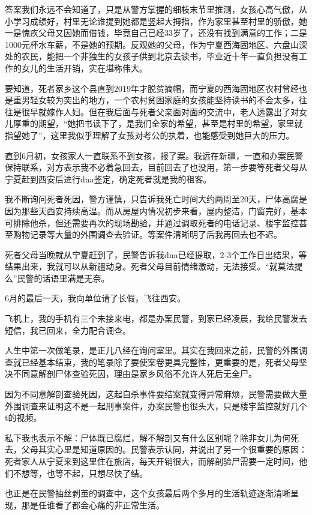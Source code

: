 答案我们永远不会知道了，只是从警方掌握的细枝末节里推测，女孩心高气傲，从小学习成绩好，村里无论谁提到她都是竖起大拇指，作为家里甚至村里的骄傲，她一是愧疚父母又因她而借钱，毕竟自己已经33岁了，还没有找到满意的工作；二是1000元杯水车薪，不是她的预期。反观她的父母，作为宁夏西海固地区、六盘山深处的农民，能把一个非独生的女孩子供到北京去读书，毕业近十年一直负担没有工作的女儿的生活开销，实在堪称伟大。

要知道，死者家乡这个县直到2019年才脱贫摘帽，而宁夏的西海固地区农村曾经也是重男轻女较为突出的地方，一个农村贫困家庭的女孩能坚持读书的不会太多，往往是很早就嫁作人妇。但在我后面与死者父亲面对面的交流中，老人透露出了对女儿厚重的期望，“她把书读下了，是我们全家的希望，甚至是村里的希望，家里就指望她了”，这里我似乎理解了女孩对考公的执着，也能感受到她巨大的压力。

直到6月初，女孩家人一直联系不到女孩，报了案。我远在新疆，一直和办案民警保持联系，对方表示我不必着急回去，目前回去了也没用，第一步要等死者父母从宁夏赶到西安后进行dna鉴定，确定死者就是我的租客。

我不断询问死者死因，警方谨慎，只告诉我死亡时间大约两周至20天，尸体高腐是因为那些天西安持续高温。而从房屋内情况初步来看，屋内整洁，门窗完好，基本可排除他杀，但还需要再次的现场勘验，并通过调取死者的电话记录、楼宇监控甚至购物记录等大量的外围调查去验证。等案件清晰明了后我再回去也不迟。

死者父母当晚就从宁夏赶到了，民警告诉我dna已经提取，2-3个工作日出结果，等结果出来，我就可以从新疆动身。死者父母目前情绪激动，无法接受。“就莫法提么”民警的话语里满是无奈。

6月的最后一天，我向单位请了长假，飞往西安。

飞机上，我的手机有三个未接来电，都是办案民警，到家已经凌晨，我给民警发去短信，我已回来，全力配合调查。

人生中第一次做笔录，是正儿八经在询问室里。其实在我回来之前，民警的外围调查就已经基本结束，我的笔录除了要使案卷更具完整性，更重要的是，死者父母坚决不同意解剖尸体查验死因，理由是家乡风俗不允许人死后无全尸。

因为不同意解剖查验死因，这起自杀事件要结案就变得异常麻烦，民警需要做大量外围调查来证明这不是一起刑事案件，办案民警也很头大，只是楼宇监控就好几个t的视频。

私下我也表示不解：尸体既已腐烂，解不解剖又有什么区别呢？除非女儿为何死去，父母其实心里是知道原因的。民警表示认同，并说出了另一个很重要的原因：死者家人从宁夏来到这里住在旅店，每天开销很大，而解剖验尸需要一定时间，他们不想等，也等不起，只想尽快了结。

也正是在民警抽丝剥茧的调查中，这个女孩最后两个多月的生活轨迹逐渐清晰呈现，那是任谁看了都会心痛的非正常生活。

